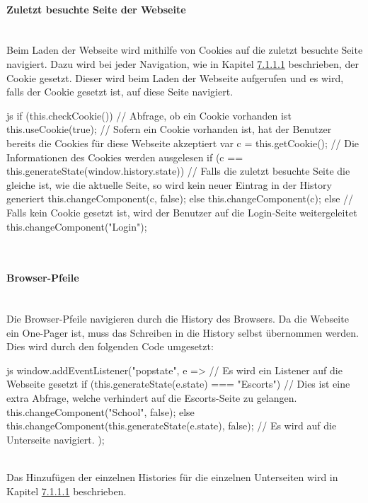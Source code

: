\paragraph{Zuletzt besuchte Seite der Webseite}~\\
Beim Laden der Webseite wird mithilfe von Cookies auf die zuletzt besuchte Seite navigiert. Dazu wird bei jeder Navigation, wie in Kapitel \hyperref[sec:navigation]{7.1.1.1} beschrieben, der Cookie gesetzt. Dieser wird beim Laden der Webseite aufgerufen und es wird, falls der Cookie gesetzt ist, auf diese Seite navigiert.
\begin{code}{js}
	if (this.checkCookie()) {		// Abfrage, ob ein Cookie vorhanden ist
		this.useCookie(true);		// Sofern ein Cookie vorhanden ist, hat der Benutzer bereits die Cookies für diese Webseite akzeptiert
		var c = this.getCookie();	// Die Informationen des Cookies werden ausgelesen
		if (c == this.generateState(window.history.state)) {	// Falls die zuletzt besuchte Seite die gleiche ist, wie die aktuelle Seite, so wird kein neuer Eintrag in der History generiert
			this.changeComponent(c, false);
		} else {
			this.changeComponent(c);
		}
	} else {
		// Falls kein Cookie gesetzt ist, wird der Benutzer auf die Login-Seite weitergeleitet
		this.changeComponent("Login");
	}
\end{code}
~\\

\paragraph{Browser-Pfeile}~\\
Die Browser-Pfeile navigieren durch die History des Browsers. Da die Webseite ein One-Pager ist, muss das Schreiben in die History selbst übernommen werden. Dies wird durch den folgenden Code umgesetzt:
\begin{code}{js}
window.addEventListener("popstate", e => {			// Es wird ein Listener auf die Webseite gesetzt
	if (this.generateState(e.state) === "Escorts") {	// Dies ist eine extra Abfrage, welche verhindert auf die Escorts-Seite zu gelangen.
		this.changeComponent("School", false);
	} else {
		this.changeComponent(this.generateState(e.state), false);	// Es wird auf die Unterseite navigiert.
	}
});
\end{code}
~\\
Das Hinzufügen der einzelnen Histories für die einzelnen Unterseiten wird in Kapitel \hyperref[sec:navigation]{7.1.1.1} beschrieben.
\newpage
